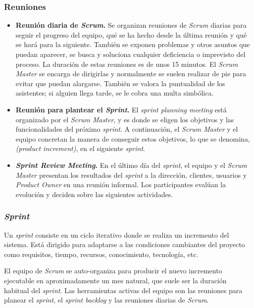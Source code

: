 \subsubsection{Reuniones}
\begin{itemize}
\item \textbf{Reunión diaria de \textit{Scrum}.} Se organizan reuniones de \textit{Scrum} diarias para seguir el progreso del equipo, qué se ha hecho desde la última reunión y qué se hará para la siguiente. También se exponen problemas y otros asuntos que puedan aparecer, se busca y soluciona cualquier deficiencia o imprevisto del proceso.  La duración de estas reuniones es de unos 15 minutos. El \textit{Scrum Master} se encarga de dirigirlas y normalmente se suelen realizar de pie para evitar que puedan alargarse. También se valora la puntualidad de los asistentes; si alguien llega tarde, se le cobra una multa simbólica. 

\item \textbf{Reunión para plantear el \textit{Sprint}.} El \textit{sprint planning meeting} está organizado por el \textit{Scrum Master}, y es donde se eligen los objetivos y las funcionalidades del próximo \textit{sprint}. A continuación, el \textit{Scrum Master} y el equipo concretan la manera de conseguir estos objetivos, lo que se denomina, \textit{(product increment)}, en el siguiente \textit{sprint}.

\item \textbf{\textit{Sprint Review Meeting}.} En el último día del \textit{sprint}, el equipo y el \textit{Scrum Master} presentan los resultados del \textit{sprint} a la dirección, clientes, usuarios y \textit{Product Owner} en una reunión informal. Los participantes evalúan la evolución y deciden sobre las siguientes actividades. 
\end{itemize}

\subsubsection{\textit{Sprint}}
Un \textit{sprint} consiste en un ciclo iterativo donde se realiza un incremento del sistema. Está dirigido para adaptarse a las condiciones cambiantes del proyecto como requisitos, tiempo, recursos, conocimiento, tecnología, etc. 

El equipo de \textit{Scrum} se auto-organiza para producir el nuevo incremento ejecutable en aproximadamente un mes natural, que suele ser la duración habitual del \textit{sprint}. Las herramientas activas del equipo son las reuniones para planear el \textit{sprint}, el \textit{sprint backlog} y las reuniones diarias de \textit{Scrum}.

